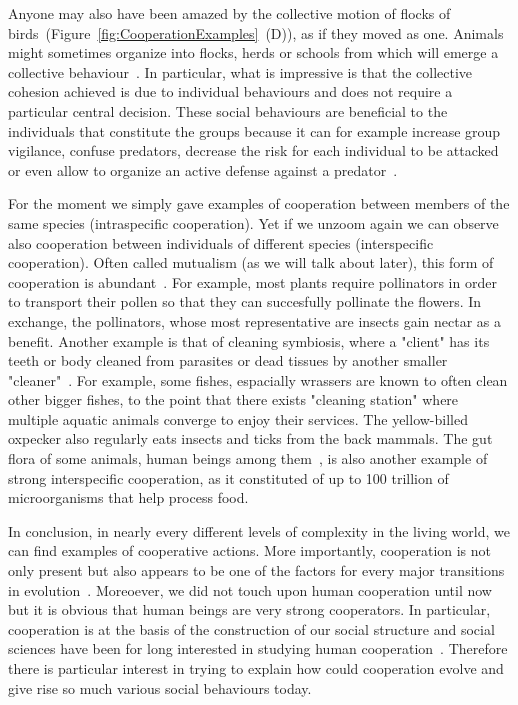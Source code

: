     Anyone may also have been amazed by the collective motion of flocks of birds~(Figure~\ref{fig:CooperationExamples}~(D)), as if they moved as one. Animals might sometimes organize into flocks, herds or schools from which will emerge a collective behaviour~\parencite{Couzin2002, Couzin2003}. In particular, what is impressive is that the collective cohesion achieved is due to individual behaviours and does not require a particular central decision. These social behaviours are beneficial to the individuals that constitute the groups because it can for example increase group vigilance, confuse predators, decrease the risk for each individual to be attacked or even allow to organize an active defense against a predator~\parencite{Hamilton1971, Olson2013}.

    For the moment we simply gave examples of cooperation between members of the same species (intraspecific cooperation). Yet if we unzoom again we can observe also cooperation between individuals of different species (interspecific cooperation). Often called mutualism (as we will talk about later), this form of cooperation is abundant~\parencite{Bshary2004}. For example, most plants require pollinators in order to transport their pollen so that they can succesfully pollinate the flowers. In exchange, the pollinators, whose most representative are insects gain nectar as a benefit. Another example is that of cleaning symbiosis, where a "client" has its teeth or body cleaned from parasites or dead tissues by another smaller "cleaner"~\parencite{Poulin1996}. For example, some fishes, espacially wrassers are known to often clean other bigger fishes, to the point that there exists "cleaning station" where multiple aquatic animals converge to enjoy their services. The yellow-billed oxpecker also regularly eats insects and ticks from the back mammals. The gut flora of some animals, human beings among them~\parencite{Backhed2005}, is also another example of strong interspecific cooperation, as it constituted of up to 100 trillion of microorganisms that help process food.



    In conclusion, in nearly every different levels of complexity in the living world, we can find examples of cooperative actions. More importantly, cooperation is not only present but also appears to be one of the factors for every major transitions in evolution~\parencite{Szathmary1995}. Moreoever, we did not touch upon human cooperation until now but it is obvious that human beings are very strong cooperators. In particular, cooperation is at the basis of the construction of our social structure and social sciences have been for long interested in studying human cooperation~\parencite{West2011a}. Therefore there is particular interest in trying to explain how could cooperation evolve and give rise so much various social behaviours today. 


